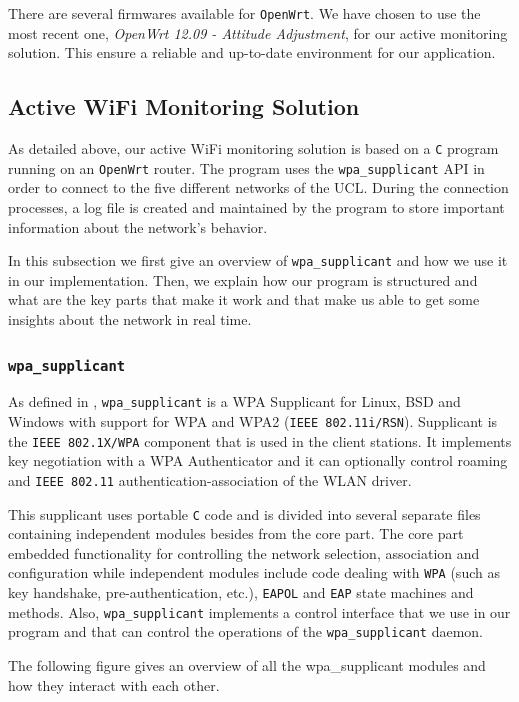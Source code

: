 There are several firmwares available for \texttt{OpenWrt}. We have chosen to use the most recent one, \textit{OpenWrt 12.09 - Attitude Adjustment}, for our active monitoring solution. This ensure a reliable and up-to-date environment for our application.


\subsection{Active WiFi Monitoring Solution}
As detailed above, our active WiFi monitoring solution is based on a \texttt{C} program running on an \texttt{OpenWrt} router. The program uses the \texttt{wpa\_supplicant} API in order to connect to the five different networks of the UCL. During the connection processes, a log file is created and maintained by the program to store important information about the network's behavior. 

In this subsection we first give an overview of \texttt{wpa\_supplicant} and how we use it in our implementation. Then, we explain how our program is structured and what are the key parts that make it work and that make us able to get some insights about the network in real time.

\subsubsection{\texttt{wpa\_supplicant}} %
 As defined in \cite{wpa-supplicant}, \texttt{wpa\_supplicant} is a WPA Supplicant for Linux, BSD and Windows with support for WPA and WPA2 (\texttt{IEEE 802.11i/RSN}). Supplicant is the \texttt{IEEE 802.1X/WPA} component that is used in the client stations. It implements key negotiation with a WPA Authenticator and it can optionally control roaming and \texttt{IEEE 802.11} authentication-association of the WLAN driver.

 This supplicant uses portable \texttt{C} code and is divided into several separate files containing independent modules besides from the core part. The core part embedded functionality for controlling the network selection, association and configuration while independent modules include code dealing with \texttt{WPA} (such as key handshake, pre-authentication, etc.), \texttt{EAPOL} and \texttt{EAP} state machines and methods. Also, \texttt{wpa\_supplicant} implements a control interface that we use in our program and that can control the operations of the \texttt{wpa\_supplicant} daemon.

The following figure gives an overview of all the wpa\_supplicant modules and how they interact with each other.

